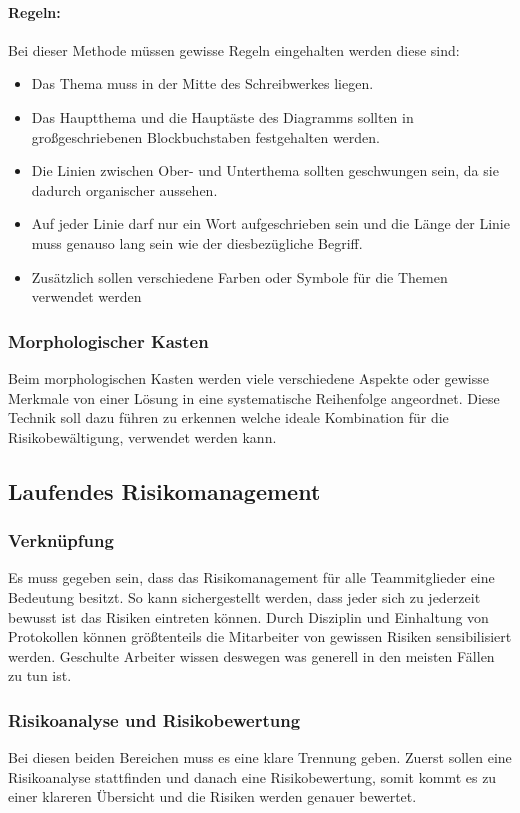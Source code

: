 \paragraph{Regeln:} Bei dieser Methode müssen gewisse Regeln eingehalten werden diese sind:
\begin{itemize}
	\item Das Thema muss in der Mitte des Schreibwerkes liegen.
	\item Das Hauptthema und die Hauptäste des Diagramms sollten in großgeschriebenen Blockbuchstaben festgehalten werden.
	\item Die Linien zwischen Ober- und Unterthema sollten geschwungen sein, da sie dadurch organischer aussehen.
	\item Auf jeder Linie darf nur ein Wort aufgeschrieben sein und die Länge der Linie muss genauso lang sein wie der diesbezügliche Begriff.
	\item Zusätzlich sollen verschiedene Farben oder Symbole für die Themen verwendet werden
\end{itemize}


\subsubsection{Morphologischer Kasten}
Beim morphologischen Kasten werden viele verschiedene Aspekte oder gewisse Merkmale von einer Lösung in eine systematische Reihenfolge angeordnet. Diese Technik soll dazu führen zu erkennen welche ideale Kombination für die Risikobewältigung, verwendet werden kann.

\subsection{Laufendes Risikomanagement}
\subsubsection{Verknüpfung}
Es muss gegeben sein, dass das Risikomanagement für alle Teammitglieder eine Bedeutung besitzt. So kann sichergestellt werden, dass jeder sich zu jederzeit bewusst ist das Risiken eintreten können. Durch Disziplin und Einhaltung von Protokollen können größtenteils die Mitarbeiter von gewissen Risiken sensibilisiert werden. Geschulte Arbeiter wissen deswegen was generell in den meisten Fällen zu tun ist.

\subsubsection{Risikoanalyse und Risikobewertung}
Bei diesen beiden Bereichen muss es eine klare Trennung geben. Zuerst sollen eine Risikoanalyse stattfinden und danach eine Risikobewertung, somit kommt es zu einer klareren Übersicht und die Risiken werden genauer bewertet.

